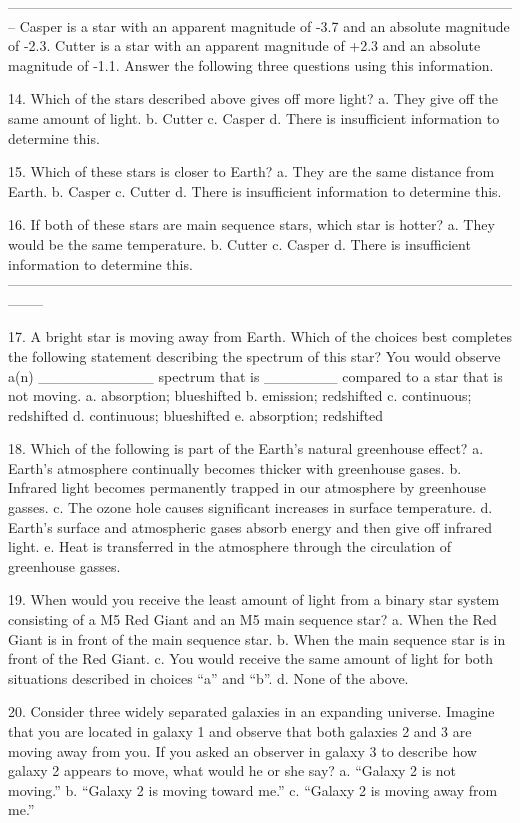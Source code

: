  --------------------------------------------------------------------------------------------------------------
Casper is a star with an apparent magnitude of -3.7 and an absolute magnitude of -2.3.  Cutter is a star with an apparent magnitude of +2.3 and an absolute magnitude of -1.1.  Answer the following three questions using this information.

14. Which of the stars described above gives off more light?
a. They give off the same amount of light.
b. Cutter
c. Casper
d. There is insufficient information to determine this.

15. Which of these stars is closer to Earth?
a. They are the same distance from Earth.
b. Casper
c. Cutter
d. There is insufficient information to determine this.


16. If both of these stars are main sequence stars, which star is hotter?
a. They would be the same temperature.
b. Cutter
c. Casper
d. There is insufficient information to determine this.
--------------------------------------------------------------------------------------------------------------------

17. A bright star is moving away from Earth. Which of the choices best completes the following statement describing the spectrum of this star?  
You would observe a(n) ___________ spectrum that is  _______ compared to a star that is not moving.
a. absorption; blueshifted 
b. emission; redshifted 
c. continuous; redshifted
d. continuous; blueshifted 
e. absorption;  redshifted 


18. Which of the following is part of the Earth’s natural greenhouse effect? 
a. Earth’s atmosphere continually becomes thicker with greenhouse gases. 
b. Infrared light becomes permanently trapped in our atmosphere by greenhouse gasses.
c. The ozone hole causes significant increases in surface temperature.
d. Earth’s surface and atmospheric gases absorb energy and then give off infrared light.
e. Heat is transferred in the atmosphere through the circulation of greenhouse gasses.


19. When would you receive the least amount of light from a binary star system consisting of a M5 Red Giant and an M5 main sequence star?  
a. When the Red Giant is in front of the main sequence star.
b. When the main sequence star is in front of the Red Giant.
c. You would receive the same amount of light for both situations described in choices “a” and “b”.
d. None of the above.


20. Consider three widely separated galaxies in an expanding universe. Imagine that you are located in galaxy 1 and observe that both galaxies 2 and 3 are moving away from you. If you asked an observer in galaxy 3 to describe how galaxy 2 appears to move, what would he or she say?
a. “Galaxy 2 is not moving.”
b. “Galaxy 2 is moving toward me.”
c. “Galaxy 2 is moving away from me.”



